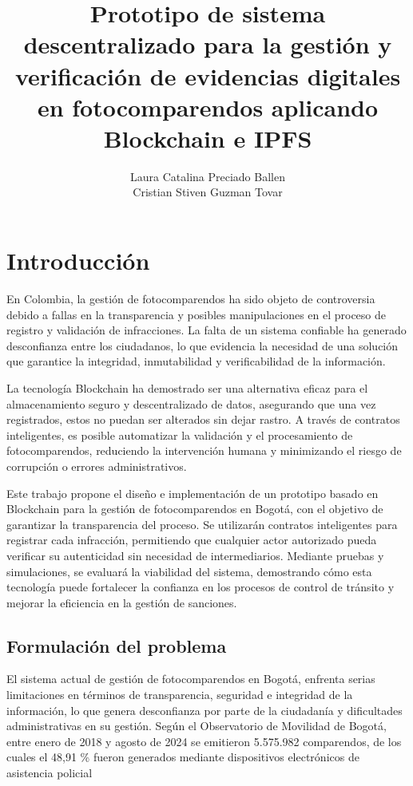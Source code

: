 \documentclass[
    letterpaper, 
    man,   
    spanish,
    12pt,
    donotrepeattitle,
    floatsintext,
    hidelinks %
]{apa7}
\title{Prototipo de sistema descentralizado para la gestión y verificación de evidencias digitales en fotocomparendos aplicando Blockchain e IPFS }
\author{Laura Catalina Preciado Ballen \\Cristian Stiven Guzman Tovar}
\affiliation{Universidad Distrital Francisco José de Caldas}
\renewcommand{\large}{\fontsize{14.4}{18}\selectfont}
\begin{document}


\raggedbottom 

\renewcommand\contentsname{\textbf{Índice}}
\tableofcontents
\setcounter{tocdepth}{2}
\newpage
\renewcommand{\listfigurename}{\textbf{Índice de figuras}}
\listoffigures
\newpage
\renewcommand{\listtablename}{\textbf{Índice de tablas}}
\listoftables
\newpage


\section{\large Introducción}
En Colombia, la gestión de fotocomparendos ha sido objeto de controversia debido a fallas en la transparencia y posibles manipulaciones en el proceso de registro y validación de infracciones. La falta de un sistema confiable ha generado desconfianza entre los ciudadanos, lo que evidencia la necesidad de una solución que garantice la integridad, inmutabilidad y verificabilidad de la información.

La tecnología Blockchain ha demostrado ser una alternativa eficaz para el almacenamiento seguro y descentralizado de datos, asegurando que una vez registrados, estos no puedan ser alterados sin dejar rastro. A través de contratos inteligentes, es posible automatizar la validación y el procesamiento de fotocomparendos, reduciendo la intervención humana y minimizando el riesgo de corrupción o errores administrativos.

Este trabajo propone el diseño e implementación de un prototipo basado en Blockchain para la gestión de fotocomparendos en Bogotá, con el objetivo de garantizar la transparencia del proceso. Se utilizarán contratos inteligentes para registrar cada infracción, permitiendo que cualquier actor autorizado pueda verificar su autenticidad sin necesidad de intermediarios. Mediante pruebas y simulaciones, se evaluará la viabilidad del sistema, demostrando cómo esta tecnología puede fortalecer la confianza en los procesos de control de tránsito y mejorar la eficiencia en la gestión de sanciones.

\subsection{Formulación del problema}
El sistema actual de gestión de fotocomparendos en Bogotá, enfrenta serias limitaciones en términos de transparencia, seguridad e integridad de la información, lo que genera desconfianza por parte de la ciudadanía y dificultades administrativas en su gestión. Según el Observatorio de Movilidad de Bogotá, entre enero de 2018 y agosto de 2024 se emitieron 5.575.982 comparendos, de los cuales el 48,91 \% fueron generados mediante dispositivos electrónicos de asistencia policial \parencite{ObservatorioComparendos2025}
\end{document}
